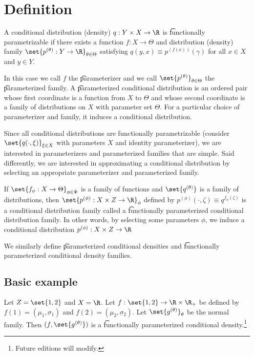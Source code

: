 

\section*{Definition}

A conditional distribution (density) $q: Y \times X \to \R $ is \t{functionally parametrizable} if there exists a function $f: X \to \Theta$ and distribution (density) family $\set{p^{(\theta )}: Y \to \R }_{\theta  \in \Theta}$ satisfying $q(y, x) \equiv p^{(f(x))}(\gamma )$ for all $x \in X$ and $y \in Y$.

In this case we call $f$ the \t{parameterizer} and we call $\set{p^{(\theta )}}_{\theta  \in \Theta}$ the \t{parameterized family}.
A \t{parameterized conditional distribution} is an ordered pair whose first coordinate is a function from $X$ to $\Theta$ and whose second coordinate is a family of distributions on $X$ with parameter set $\Theta$.
For a particular choice of parameterizer and family, it induces a conditional distribution.

Since all conditional distributions are functionally parametrizable (consider $\set{q(\cdot , \xi )}_{\xi  \in X}$ with parameters $X$ and identity parameterizer), we are interested in parameterizers and parameterized families that are simple.
Said differently, we are interested in approximating a conditional distribution by selecting an appropriate parameterizer and parameterized family.

If $\set{f_{\phi }: X \to \Theta}_{\phi  \in \Phi}$ is a family of functions and $\set{q^{(\theta )}}$ is a family of distributions, then $\set{p^{(\phi )}: X \times Z \to \R }_{\phi }$ defined by $p^{(\phi )}(\cdot , \zeta ) \equiv q^{f_\phi (\zeta )}$ is a conditional distribution family called a \t{functionally parameterized conditional distribution family}.
In other words, by selecting some parameters $\phi $, we induce a conditional distribution $p^{(\phi )}: X \times Z \to \R $

We similarly define \t{parameterized conditional densities} and \t{functionally parameterized conditional density families}.

\subsection*{Basic example}

Let $Z = \set{1, 2}$ and $X = \R $. Let $f: \set{1, 2} \to \R  \times \R _+$ be defined by $f(1) = (\mu _1, \sigma _1)$ and $f(2) = (\mu _2, \sigma _2)$.
Let $\set{g^{(\theta )}}_{\theta }$ be the normal family.
Then $(f, \set{g^{(\theta )}})$ is a \t{functionally parameterized conditional density}.\footnote{Future editions will modify.}

\blankpage